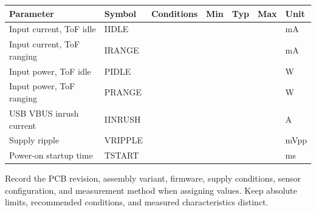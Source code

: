 \documentclass[10pt,a4paper,oneside]{report}
\begin{document}
{\def\LTcaptype{none} %
\begin{longtable}[]{@{}
  >{\raggedright\arraybackslash}p{}
  >{\raggedright\arraybackslash}p{}
  >{\raggedright\arraybackslash}p{}
  >{\raggedright\arraybackslash}p{}
  >{\raggedright\arraybackslash}p{}
  >{\raggedright\arraybackslash}p{}
  >{\raggedright\arraybackslash}p{}@{}}
\toprule\noalign{}
\begin{minipage}[b]{\linewidth}\raggedright
\textbf{Parameter}
\end{minipage} & \begin{minipage}[b]{\linewidth}\raggedright
\textbf{Symbol}
\end{minipage} & \begin{minipage}[b]{\linewidth}\raggedright
\textbf{Conditions}
\end{minipage} & \begin{minipage}[b]{\linewidth}\raggedright
\textbf{Min}
\end{minipage} & \begin{minipage}[b]{\linewidth}\raggedright
\textbf{Typ}
\end{minipage} & \begin{minipage}[b]{\linewidth}\raggedright
\textbf{Max}
\end{minipage} & \begin{minipage}[b]{\linewidth}\raggedright
\textbf{Unit}
\end{minipage} \\
\midrule\noalign{}
\endhead
\bottomrule\noalign{}
\endlastfoot
Input current, ToF idle & IIDLE & & & & & mA \\
Input current, ToF ranging & IRANGE & & & & & mA \\
Input power, ToF idle & PIDLE & & & & & W \\
Input power, ToF ranging & PRANGE & & & & & W \\
USB VBUS inrush current & IINRUSH & & & & & A \\
Supply ripple & VRIPPLE & & & & & mVpp \\
Power-on startup time & TSTART & & & & & ms \\
\end{longtable}
}

Record the PCB revision, assembly variant, firmware, supply conditions, sensor configuration, and measurement method when assigning values. Keep absolute limits, recommended conditions, and measured characteristics distinct.
\end{document}
